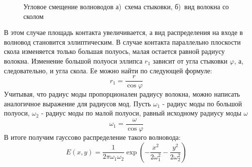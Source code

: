 \begin{figure}[h!]
	\begin{minipage}[h]{0.49\linewidth}
	\end{minipage}
	\hfill
	\begin{minipage}[h]{0.49\linewidth}
	\end{minipage}
	\caption{Угловое смещение волноводов а)~схема стыковки, б)~вид волокна со сколом}
	\label{angular_movement}
\end{figure}

В этом случае площадь контакта увеличивается, а вид распределения на входе в волновод становится эллиптическим. В случае контакта параллельно плоскости скола изменяется только большая полуось, малая остается равной радиусу волокна. Изменение большой полуоси эллипса $r_1$ зависит от угла стыковки $\varphi$, а, следовательно, и угла скола. Ее можно найти по следующей формуле:
\begin{equation}
	r_1 = \frac{r}{\cos \varphi}
\end{equation}
Учитывая, что радиус моды пропорционален радиусу волокна, можно написать аналогичное выражение для радиусов мод. Пусть $\omega_1$ - радиус моды по большой полуоси, $\omega_2$ - радиус моды по малой полуоси, равный исходному радиусу моды $\omega$
\begin{equation}
	\omega_1 = \frac{\omega}{\cos \varphi}
	\label{ellipse_axis}
\end{equation}
В итоге получим гауссово распределение такого волновода:
\begin{equation}
  E(x,y)=\frac{1}{2\pi\omega_1\omega_2}\exp\left(-\frac{x^2}{2\omega_1^2}-\frac{y^2}{2\omega_2^2}\right)
\end{equation}

